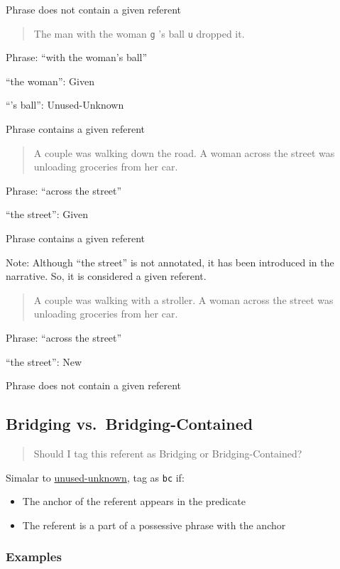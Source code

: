 \documentclass[
]{book}
\begin{document}
Phrase does not contain a given referent

\begin{quote}
The man with the woman \texttt{g} 's ball \texttt{u} dropped it.
\end{quote}

Phrase: ``with the woman's ball''

``the woman'': Given

``'s ball'': Unused-Unknown

Phrase contains a given referent

\begin{quote}
A couple was walking down the road.
A woman across the street was unloading groceries from her car.
\end{quote}

Phrase: ``across the street''

``the street'': Given

Phrase contains a given referent

Note: Although ``the street'' is not annotated, it has been introduced in the narrative.
So, it is considered a given referent.

\begin{quote}
A couple was walking with a stroller.
A woman across the street was unloading groceries from her car.
\end{quote}

Phrase: ``across the street''

``the street'': New

Phrase does not contain a given referent

\hypertarget{bridging-vs.-bridging-contained}{%
\subsection{Bridging vs.~Bridging-Contained}\label{bridging-vs.-bridging-contained}}

\begin{quote}
Should I tag this referent as Bridging or Bridging-Contained?
\end{quote}

Simalar to \protect\hyperlink{new-vs.-unused-unknown}{unused-unknown}, tag as \texttt{bc} if:

\begin{itemize}
\item
  The anchor of the referent appears in the predicate
\item
  The referent is a part of a possessive phrase with the anchor
\end{itemize}

\hypertarget{examples-1}{%
\subsubsection{Examples}\label{examples-1}}
\end{document}
